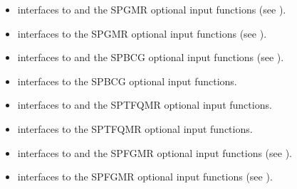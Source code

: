 \documentclass[letterpaper,10pt,english]{sphinxmanual}
\begin{document}
\begin{itemize}
\item {} 
{\hyperref[f_interface/Usage:f/_/FARKMASSSPGMR]{\emph{}}} interfaces to {\hyperref[c_interface/User_callable:c.ARKMassSpgmr]{\emph{}}} and
the SPGMR optional input functions (see
{\hyperref[c_interface/User_callable:cinterface-arkspilsinputtable]{\emph{}}}).

\item {} 
{\hyperref[f_interface/Usage:f/_/FARKMASSSPGMRREINIT]{\emph{}}} interfaces to the SPGMR optional input
functions (see {\hyperref[c_interface/User_callable:cinterface-arkspilsinputtable]{\emph{}}}).

\item {} 
{\hyperref[f_interface/Usage:f/_/FARKMASSSPBCG]{\emph{}}} interfaces to {\hyperref[c_interface/User_callable:c.ARKMassSpbcg]{\emph{}}} and
the SPBCG optional input functions (see
{\hyperref[c_interface/User_callable:cinterface-arkspilsinputtable]{\emph{}}}).

\item {} 
{\hyperref[f_interface/Usage:f/_/FARKMASSSPBCGREINIT]{\emph{}}} interfaces to the SPBCG optional input
functions.

\item {} 
{\hyperref[f_interface/Usage:f/_/FARKMASSSPTFQMR]{\emph{}}} interfaces to {\hyperref[c_interface/User_callable:c.ARKMassSptfqmr]{\emph{}}}
and the SPTFQMR optional input functions.

\item {} 
{\hyperref[f_interface/Usage:f/_/FARKMASSSPTFQMRREINIT]{\emph{}}} interfaces to the SPTFQMR optional
input functions.

\item {} 
{\hyperref[f_interface/Usage:f/_/FARKMASSSPFGMR]{\emph{}}} interfaces to {\hyperref[c_interface/User_callable:c.ARKMassSpfgmr]{\emph{}}}
and the SPFGMR optional input functions (see
{\hyperref[c_interface/User_callable:cinterface-arkspilsinputtable]{\emph{}}}).

\item {} 
{\hyperref[f_interface/Usage:f/_/FARKMASSSPFGMRREINIT]{\emph{}}} interfaces to the SPFGMR optional
input functions (see {\hyperref[c_interface/User_callable:cinterface-arkspilsinputtable]{\emph{}}}).


\end{itemize}
\end{document}
